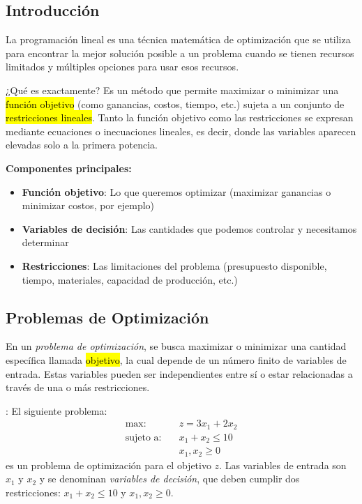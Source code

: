 \subsection{Introducción}

La programación lineal es una técnica matemática de optimización que se utiliza para encontrar la mejor solución posible a un problema cuando se tienen recursos limitados y múltiples opciones para usar esos recursos.

¿Qué es exactamente? Es un método que permite maximizar o minimizar una \hl{función objetivo} (como ganancias, costos, tiempo, etc.) sujeta a un conjunto de \hl{restricciones lineales}. Tanto la función objetivo como las restricciones se expresan mediante ecuaciones o inecuaciones lineales, es decir, donde las variables aparecen elevadas solo a la primera potencia.

\noindent\textbf{Componentes principales:}
\begin{itemize}
  \item \textbf{Función objetivo}: Lo que queremos optimizar (maximizar ganancias o minimizar costos, por ejemplo)
  \item \textbf{Variables de decisión}: Las cantidades que podemos controlar y necesitamos determinar
  \item \textbf{Restricciones}: Las limitaciones del problema (presupuesto disponible, tiempo, materiales, capacidad de producción, etc.)
\end{itemize}

\subsection{Problemas de Optimización}

En un \textit{problema de optimización}, se busca maximizar o minimizar una cantidad específica llamada \hl{objetivo}, la cual depende de un número finito de variables de entrada. Estas variables pueden ser independientes entre sí o estar relacionadas a través de una o más restricciones.

\ejemplo\label{ej:ppl_lineal}: El siguiente problema:
\begin{align*}
  \text{max:} \quad         &z = 3x_1 + 2x_2 \\[3pt]
  \text{sujeto a:} \quad    &x_1 + x_2 \leq 10 \\
                            &x_1,x_2 \geq 0
\end{align*}
es un problema de optimización para el objetivo \(z\). Las variables de entrada son \(x_1\) y \(x_2\) y se denominan \textit{variables de decisión}, que deben cumplir dos restricciones: \(x_1 + x_2 \leq 10\) y \(x_1,x_2 \geq 0\).

